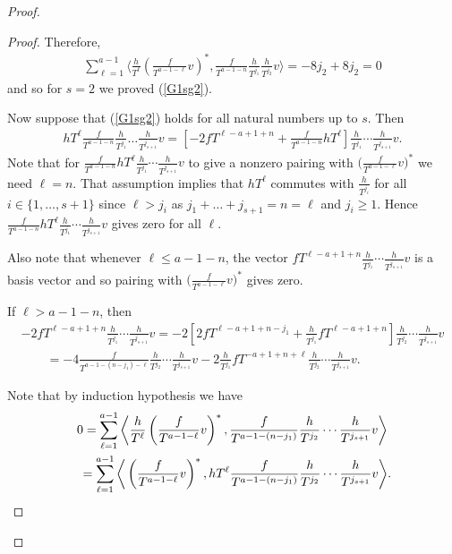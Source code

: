 \documentclass[11pt]{article}
\numberwithin{equation}{section}
\begin{document}
\begin{proof}
\begin{proof}
Therefore,
\begin{gather*}
\sum_{\ell=1}^{a-1} \bigg\langle \frac{h}{T^{\ell}} \left(\frac{f}{T^{a-1-\ell}}v\right)^*, \frac{f}{T^{a-1-n}} \frac{h}{T^{j_1}} \frac{h}{T^{j_2}} v \bigg\rangle = -8 j_2 + 8 j_2 = 0
\end{gather*}
and so for $s=2$ we proved (\ref{G1sg2}).

Now suppose that (\ref{G1sg2}) holds for all natural numbers up to $s$. Then
\begin{gather*}
hT^{\ell} \frac{f}{T^{a-1-n}} \frac{h}{T^{j_1}}\dots\frac{h}{T^{j_{s+1}}} v = \left[ -2 fT^{\ell-a+1+n} + \frac{f}{T^{a-1-n}} hT^{\ell} \right] \frac{h}{T^{j_1}}\cdots\frac{h}{T^{j_{s+1}}} v.
\end{gather*}
Note that for $\frac{f}{T^{a-1-n}} hT^{\ell} \frac{h}{T^{j_1}} \cdots \frac{h}{T^{j_{s+1}}} v$ to give a nonzero pairing with $\big(\frac{f}{T^{a-1-\ell}}v\big)^*$
we need $\ell=n$. That assumption implies that $hT^{\ell}$ commutes with $\frac{h}{T^{j_i}}$ for all $i \in \{1, \dots, s+1\}$ since $\ell > j_i$ as $j_1+\dots +j_{s+1} =n=\ell$ and $j_i \geq 1$. Hence $ \frac{f}{T^{a-1-n}} hT^{\ell} \frac{h}{T^{j_1}}\cdots \frac{h}{T^{j_{s+1}}} v $ gives zero for all $\ell$.

Also note that whenever $\ell \leq a-1-n$, the vector $fT^{\ell-a+1+n} \frac{h}{T^{j_1}} \cdots \frac{h}{T^{j_{s+1}}} v$ is a basis vector and so pairing with $\big(\frac{f}{T^{a-1-\ell}}v\big)^*$ gives zero.

If $\ell > a-1-n$, then
\begin{gather}
-2 fT^{\ell-a+1+n} \frac{h}{T^{j_1}}\cdots\frac{h}{T^{j_{s+1}}} v=-2 \left[ 2fT^{\ell-a+1+n - j_1} + \frac{h}{T^{j_1}} fT^{\ell-a+1+n}\right] \frac{h}{T^{j_2}}\cdots\frac{h}{T^{j_{s+1}}} v \nonumber \\
\qquad{} = -4 \frac{f}{T^{a-1 - (n-j_1) - \ell}}\frac{h}{T^{j_2}}\cdots\frac{h}{T^{j_{s+1}}}v - 2 \frac{h}{T^{j_1}} fT^{-a+1 + n + \ell} \frac{h}{T^{j_2}}\cdots\frac{h}{T^{j_{s+1}}}v. \label{fs sum}
\end{gather}

Note that by induction hypothesis we have
\begin{gather*}
0 = \sum_{\ell=1}^{a-1} \bigg\langle \frac{h}{T^{\ell}} \left(\frac{f}{T^{a-1-\ell}}v\right)^*, \frac{f}{T^{a-1-(n-j_1)}} \frac{h}{T^{j_2}}\cdots\frac{h}{T^{j_{s+1}}} v \bigg\rangle \nonumber \\
\hphantom{0} = \sum_{\ell=1}^{a-1} \bigg\langle \left(\frac{f}{T^{a-1-\ell}}v\right)^*, hT^{\ell} \frac{f}{T^{a-1-(n-j_1)}} \frac{h}{T^{j_2}}\cdots\frac{h}{T^{j_{s+1}}} v \bigg\rangle. %
\end{gather*}


\end{proof}
\end{proof}
\end{document}
